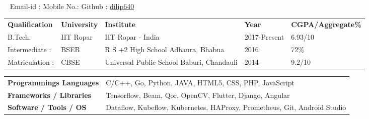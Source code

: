 \documentclass[a4paper,12pt]{awesome}
\newcommand{\psep}{-0.6cm}
\begin{document}
\ \linebreak
{} \hfill Email-id :  \linebreak
{} \hfill Mobile No.:  \linebreak
{} \hfill Github : \href{https://github.com/dilip640}{dilip640}
\linebreak \linebreak
{}

\begin{tabular}{ l @{\hskip 0.12in} l @{\hskip 0.12in} l @{\hskip 0.12in} l @{\hskip 0.12in} l }

\textbf{Qualification} & \textbf{University} & \textbf{Institute} & \textbf{Year} & \textbf{CGPA/Aggregate\%} \\

B.Tech.& IIT Ropar & IIT Ropar  - India & 2017-Present & 6.93/10 \\
Intermediate :& BSEB & R S +2 High School Adhaura, Bhabua & 2016  &  72\% \\
Matriculation :& CBSE & Universal Public School Baburi, Chandauli  & 2014& 9.2/10 \\
\end{tabular} \linebreak
{}\linebreak
\indent 
\begin{tabular}{ l @{\hskip 0.006cm} l }
    \textbf{Programmings Languages } & C/C++, Go, Python, JAVA, HTML5, CSS, PHP, JavaScript \\
    \textbf{Frameworks / Libraries} & Tensorflow, Beam, Qor, OpenCV, Flutter, Django, Angular \\ 
    \textbf{Software / Tools / OS} & Dataflow, Kubeflow, Kubernetes, HAProxy, Prometheus, Git, Android Studio  \\
\end{tabular}\\
\linebreak
{}\\[\psep]
\end{document}
